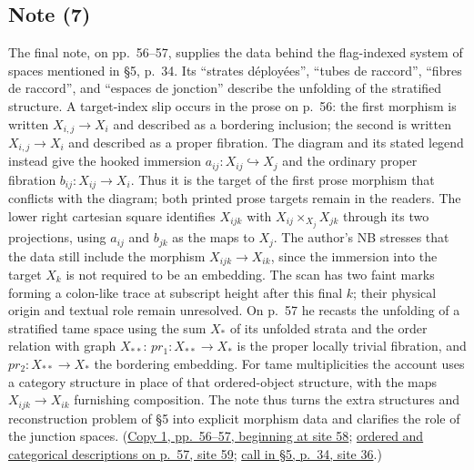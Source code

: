 \documentclass[11pt,a4paper]{article}
\newcounter{editionexternallink}
\newcounter{appnote}
\begin{document}
\subsection*{Note (7)}
The final note, on pp.~56--57, supplies the data behind the flag-indexed
system of spaces mentioned in \S5, p.~34. Its ``strates déployées'',
``tubes de raccord'', ``fibres de raccord'', and ``espaces de jonction''
describe the unfolding of the stratified structure. A target-index slip
occurs in the prose on p.~56: the first morphism is written
$X_{i,j}\longrightarrow X_i$ and described as a bordering inclusion;
the second is written $X_{i,j}\rightarrow X_i$ and described as a proper
fibration. The diagram and its stated legend
instead give the hooked immersion
$a_{ij}:X_{ij}\hookrightarrow X_j$ and the ordinary proper fibration
$b_{ij}:X_{ij}\longrightarrow X_i$. Thus it is the target of the first
prose morphism that conflicts with the diagram; both printed prose
targets remain in the readers. The lower right cartesian square identifies
$X_{ijk}$ with $X_{ij}\times_{X_j}X_{jk}$ through its two projections,
using $a_{ij}$ and $b_{jk}$ as the maps to $X_j$. The author's NB stresses
that the data still include the morphism
$X_{ijk}\longrightarrow X_{ik}$, since the immersion into the target
$X_k$ is not required to be an embedding. The scan has two faint marks
forming a colon-like trace at subscript height after this final $k$; their
physical origin and textual role remain unresolved. On p.~57
he recasts the unfolding of a stratified tame space using the sum $X_*$
of its unfolded strata and the order relation with graph $X_{**}$:
$pr_1:X_{**}\longrightarrow X_*$ is the proper locally trivial fibration,
and $pr_2:X_{**}\longrightarrow X_*$ the bordering embedding. For tame
multiplicities the account uses a category structure in place of that
ordered-object structure, with the maps
$X_{ijk}\longrightarrow X_{ik}$ furnishing composition. The note thus
turns the extra structures and reconstruction problem of \S5 into
explicit morphism data and clarifies the role of the junction spaces.
(\href{https://grothendieck.umontpellier.fr/web/viewer.html?file=../119.pdf\#page=59}{Copy 1, pp.~56--57, beginning at site 58};
\href{https://grothendieck.umontpellier.fr/web/viewer.html?file=../119.pdf\#page=60}{ordered and categorical descriptions on p.~57, site 59};
\href{https://grothendieck.umontpellier.fr/web/viewer.html?file=../119.pdf\#page=37}{call in \S5, p.~34, site 36}.)

\end{document}
